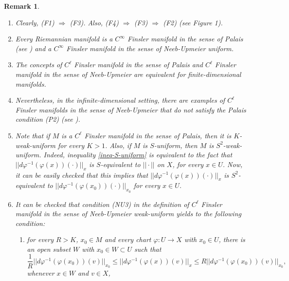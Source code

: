 \documentclass[11pt]{amsart}
\newtheorem{rem}[thm]{Remark}
\numberwithin{equation}{section}
\begin{document}
\begin{rem}\label{remark}
\begin{enumerate}
\item Clearly, {\em (F1)} $\Rightarrow$ {\em (F3)}. Also,  {\em (F4)} $\Rightarrow$ {\em
(F3)} $\Rightarrow$ {\em (F2)} (see Figure 1).
\item Every Riemannian manifold is  a $C^\infty$ Finsler manifold in the sense of Palais (see  \cite{Palais}) and a $C^\infty$ Finsler manifold in the sense of Neeb-Upmeier uniform.
\item The concepts of $C^\ell$ Finsler manifold in the sense of Palais and $C^\ell$ Finsler manifold in the sense of Neeb-Upmeier  are equivalent for finite-dimensional manifolds.
\item Nevertheless, in the infinite-dimensional setting, there are examples of  $C^\ell$ Finsler manifolds in the sense of Neeb-Upmeier that do not satisfy the Palais condition {\em (P2)}  (see \cite[Example 10]{GaGuJa}).
\item \label {remark-k} Note that if $M$ is a $C^\ell$ Finsler manifold in the sense of Palais, then it is $K$-weak-uniform for every $K>1$.
Also, if $M$ is $S$-uniform, then $M$ is $S^2$-weak-uniform.
Indeed, inequality \eqref{ineq-S-uniform} is equivalent to the fact that  $||d\varphi^{-1}(\varphi(x))(\cdot)||_x$
is $S$-equivalent to $||\cdot||$ on $X$, for every $x\in U$. Now, it can be easily checked that this implies that
$||d\varphi^{-1}(\varphi(x))(\cdot)||_x$ is $S^2$-equivalent to $||d\varphi^{-1}(\varphi(x_0))(\cdot)||_{x_0}$
for every $x\in U$.
\item \label{remark-R} It can be checked that  condition (NU3) in the definition of $C^\ell$ Finsler manifold in the sense of Neeb-Upmeier weak-uniform yields to the following condition:
\begin{enumerate}
\item[(NU3')] for every $R>K$, $x_0\in M$ and every chart $\varphi:U\to X$ with $x_0\in U$, there is an open subset $W$ with $x_0\in W\subset U$ such that
\begin{equation} \label{ineq-K-weak-uniform'}
\frac{1}{R}||d\varphi^{-1}(\varphi(x_0))(v)||_{x_0}\le ||d\varphi^{-1}(\varphi(x))(v)||_{x}\le R||d\varphi^{-1}(\varphi(x_0))(v)||_{x_0},
\end{equation}
whenever $x\in W$ and $v\in X$,
\end{enumerate}
\end{enumerate}
\end{rem}
\end{document}
